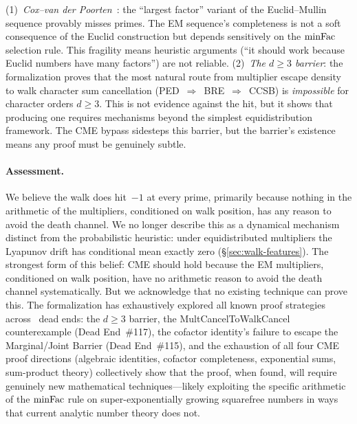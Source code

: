 (1)~\emph{Cox--van der Poorten}~\cite{CoxVdP1968}: the ``largest factor'' variant of
the Euclid--Mullin sequence provably misses primes.  The EM
sequence's completeness is not a soft consequence of the Euclid
construction but depends sensitively on the $\mathrm{minFac}$ selection
rule.  This fragility means heuristic arguments
(``it should work because Euclid numbers have many factors'') are
not reliable.
(2)~\emph{The $d \geq 3$ barrier}: the formalization proves that
the most natural route from multiplier escape density to walk
character sum cancellation (PED~$\Rightarrow$~BRE~$\Rightarrow$~CCSB) is
\emph{impossible} for character orders $d \geq 3$.  This is not
evidence against the hit, but it shows that producing one
requires mechanisms beyond the simplest equidistribution
framework.  The CME bypass sidesteps this barrier, but the barrier's
existence means any proof must be genuinely subtle.

\paragraph{Assessment.}
We believe the walk does hit~$-1$ at every prime, primarily because
nothing in the arithmetic of the multipliers, conditioned on walk
position, has any reason to avoid the death channel.  We no longer
describe this as a dynamical mechanism distinct from the probabilistic
heuristic: under equidistributed multipliers the Lyapunov drift has
conditional mean exactly zero (\S\ref{sec:walk-features}).  The
strongest form of this belief: CME should
hold because the EM multipliers, conditioned on walk position, have
no arithmetic reason to avoid the death channel systematically.
But we acknowledge that no existing technique can prove this.
The formalization has exhaustively explored all known proof strategies
across \DEentries~dead ends: the $d \geq 3$ barrier, the MultCancelToWalkCancel
counterexample (Dead End~\#117), the cofactor identity's failure to
escape the Marginal/Joint Barrier (Dead End~\#115), and the exhaustion
of all four CME proof directions (algebraic identities, cofactor
completeness, exponential sums, sum-product theory) collectively show
that the proof, when found, will require genuinely new mathematical
techniques---likely exploiting the specific arithmetic of the
$\mathrm{minFac}$ rule on super-exponentially growing squarefree numbers in
ways that current analytic number theory does not.

